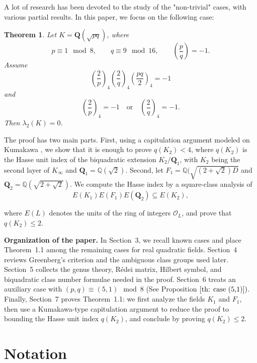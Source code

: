 \documentclass{article}
\numberwithin{equation}{section}
\theoremstyle{plain}  %
\newtheorem{theorem}{Theorem}[section]
\theoremstyle{definition}
\newcommand{\Q}{\mathbb{Q}}
\newcommand{\ot}{\mathcal{O}}
\begin{document}
A lot of research has been devoted to the study of the "non-trivial" cases, with various partial results. In this paper, we focus on the following case:
\begin{theorem} \label{th: main th}
Let $K=\mathbf{Q}(\sqrt{pq})$, where
$$
p\equiv 1 \mod{8},\qquad q\equiv 9 \mod{16},\qquad \left(\frac{p}{q}\right)=-1.
$$
Assume
$$
\left(\frac{2}{p}\right)_4\left(\frac{2}{q}\right)_4\left(\frac{pq}{2}\right)_4=-1
$$
and
$$
\left(\frac{2}{p}\right)_4=-1
\quad\text{or}\quad
\left(\frac{2}{q}\right)_4=-1.
$$
Then $\lambda_2(K)=0$.
\end{theorem}

The proof has two main parts. First, using a capitulation argument modeled on
Kumakawa \cite{MR4262274}, we show that it is enough to prove $q(K_2)<4$, where $q(K_2)$
is the Hasse unit index of the biquadratic extension $K_2/\mathbf Q_1$, with $K_2$ being the second layer of $K_{\infty}$ and $\mathbf{Q}_1=\Q (\sqrt{2})$. Second, let $F_1=\Q (\sqrt{(2+\sqrt{2})D}$ and $\mathbf{Q}_2=\Q(\sqrt{2+\sqrt{2}})$. We
compute the Hasse index by a square-class analysis of
$$
E(K_1)E(F_1)E(\mathbf{Q}_2)\subseteq E(K_2),$$ 

where $E(L)$ denotes the units of the ring of integers $\ot_L$, and prove that $q(K_2)\le 2$.


\medskip

\noindent\textbf{Organization of the paper.}
In Section~3, we recall known cases and place Theorem~1.1 among the
remaining cases for real quadratic fields. Section~4 reviews Greenberg's
criterion and the ambiguous class groups used later. Section~5 collects the
genus theory, R\'edei matrix, Hilbert symbol, and biquadratic class number
formulae needed in the proof. Section~6 treats an auxiliary case with
$(p,q)\equiv (5,1)\mod 8$ (See Proposition $\ref{th: case (5,1)})$. Finally, Section~7 proves Theorem~1.1: we first
analyze the fields $K_1$ and $F_1$, then use a Kumakawa-type
capitulation argument to reduce the proof to bounding the Hasse unit index
$q(K_2)$, and conclude by proving $q(K_2)\le 2$.

\section{Notation}
\end{document}
